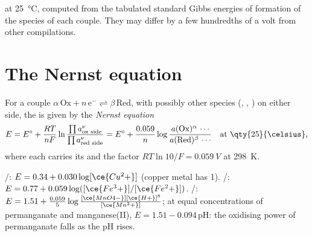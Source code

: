 \begin{omfigure}
\smallskip
{\small {} at \qty{25}{\celsius}, computed from the
tabulated standard Gibbs energies of formation of the species of each
couple. They may differ by a few hundredths of a volt from other
compilations.}
\end{omfigure}

\section{The Nernst equation}

\begin{theorem}\label{thm:b1:nernst:nernst}
For a couple $\alpha\,\mathrm{Ox} + n\,\mathrm{e^-} \rightleftharpoons
\beta\,\mathrm{Red}$, with possibly other species (, ,
) on either side, the  is given by the
\emph{Nernst equation}
\[
  E = E^\circ + \frac{RT}{nF}\ln\frac{\prod a_{\text{ox side}}^{\nu}}{\prod
  a_{\text{red side}}^{\nu}}
  = E^\circ + \frac{0.059}{n}\log\frac{a(\mathrm{Ox})^\alpha\,\cdots}{a(\mathrm{Red})^\beta\,\cdots}
  \quad\text{at \qty{25}{\celsius}},
\]
where each  carries its  and the factor
$RT\ln 10/F = \qty{0.059}{V}$ at \qty{298}{K}.
\end{theorem}


\begin{example}\label{ex:b1:nernst:examples}
/: $E = 0.34 + 0.030\log[\ce{Cu^2+}]$ (copper metal has
 1).
/: $E = 0.77 + 0.059\log([\ce{Fe^3+}]/[\ce{Fe^2+}])$.
/: $E = 1.51 + \frac{0.059}{5}\log
\frac{[\ce{MnO4-}][\ce{H+}]^8}{[\ce{Mn^2+}]}$; at equal concentrations of
permanganate and manganese(II), $E = 1.51 - 0.094\,\mathrm{pH}$: the
oxidising power of permanganate falls as the pH rises.
\end{example}

